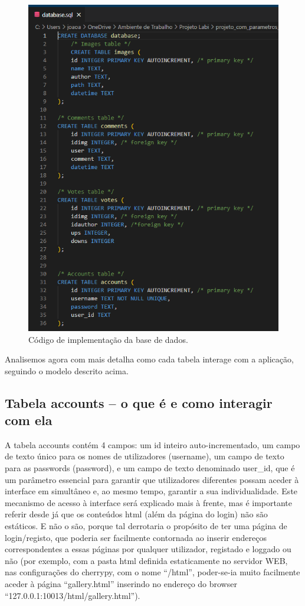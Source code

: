 \documentclass{report}
\begin{document}
\begin{figure}[!hbtp]
        \centering 
        \includegraphics[scale=0.7]{Images_code/3 - base de dados.png}
        \caption{\label{Metodologia}Código de implementação da base de dados.}
\end{figure}

Analisemos agora com mais detalha como cada tabela interage com a aplicação, seguindo o modelo descrito acima.    
\newpage

\subsection{Tabela accounts – o que é e como interagir com ela}

A tabela accounts contém 4 campos: um id inteiro auto-incrementado, um campo de texto único para os nomes de utilizadores (username), um campo de texto para as passwords (password), e um campo de texto denominado user\_id, que é um parâmetro essencial para garantir que utilizadores diferentes possam aceder à interface em simultâneo e, ao mesmo tempo, garantir a sua individualidade. Este mecanismo de acesso à interface será explicado mais à frente, mas é importante referir desde já que os conteúdos html (além da página do login) não são estáticos. E não o são, porque tal derrotaria o propósito de ter uma página de login/registo, que poderia ser facilmente contornada ao inserir endereços correspondentes a essas páginas por qualquer utilizador, registado e loggado ou não (por exemplo, com a pasta html definida estaticamente no servidor WEB, nas configurações do cherrypy, com o nome “/html”, poder-se-ia muito facilmente aceder à página “gallery.html” inserindo no endereço do browser “127.0.0.1:10013/html/gallery.html”).
\end{document}
